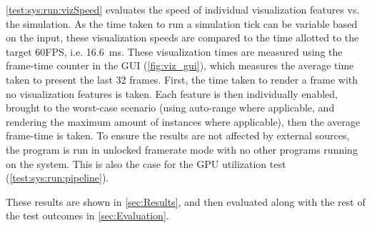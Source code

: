 

\cref{test:sys:run:vizSpeed} evaluates the speed of individual visualization features vs. the simulation.
As the time taken to run a simulation tick can be variable based on the input, these visualization speeds are compared to the time allotted to the target 60FPS, i.e. \SI{16.6}{\milli\second}.
These visualization times are measured using the frame-time counter in the GUI (\cref{fig:viz_gui}), which measures the average time taken to present the last 32 frames.
First, the time taken to render a frame with no visualization features is taken.
Each feature is then individually enabled, brought to the worst-case scenario (using auto-range where applicable, and rendering the maximum amount of instances where applicable), then the average frame-time is taken.
To ensure the results are not affected by external sources, the program is run in unlocked framerate mode with no other programs running on the system.
This is also the case for the GPU utilization test (\cref{test:sys:run:pipeline}).

These results are shown in \cref{sec:Results}, and then evaluated along with the rest of the test outcomes in \cref{sec:Evaluation}.